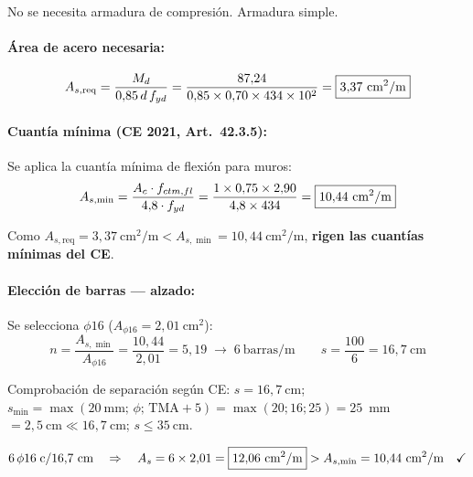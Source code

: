No se necesita armadura de compresión. Armadura simple.

\paragraph{Área de acero necesaria:}
\begin{equation}
  A_{s,\mathrm{req}} = \frac{M_d}{0{,}85\,d\,f_{yd}}
    = \frac{87{,}24}{0{,}85 \times 0{,}70 \times 434 \times 10^2}
    = \boxed{3{,}37~\text{cm}^2/\text{m}}
  \label{eq:As_fuste_calc}
\end{equation}

\paragraph{Cuantía mínima (CE 2021, Art.\ 42.3.5):}

Se aplica la cuantía mínima de flexión para muros:
\begin{equation}
  A_{s,\min} = \frac{A_c \cdot f_{ctm,fl}}{4{,}8 \cdot f_{yd}}
    = \frac{1 \times 0{,}75 \times 2{,}90}{4{,}8 \times 434}
    = \boxed{10{,}44~\text{cm}^2/\text{m}}
  \label{eq:As_min_fuste}
\end{equation}

Como $A_{s,\mathrm{req}} = 3{,}37~\text{cm}^2/\text{m} < A_{s,\min} = 10{,}44~\text{cm}^2/\text{m}$,
\textbf{rigen las cuantías mínimas del CE}.

\paragraph{Elección de barras — alzado:}

Se selecciona $\phi 16$ ($A_{\phi 16} = 2{,}01~\text{cm}^2$):
\[
  n = \frac{A_{s,\min}}{A_{\phi 16}} = \frac{10{,}44}{2{,}01} = 5{,}19
  \;\longrightarrow\; 6~\text{barras/m}
  \qquad
  s = \frac{100}{6} = 16{,}7~\text{cm}
\]

Comprobación de separación según CE: $s = 16{,}7~\text{cm}$;
$s_{\min} = \max(20~\text{mm};\,\phi;\,\mathrm{TMA}+5) = \max(20;16;25) = 25$~mm
$= 2{,}5~\text{cm} \ll 16{,}7~\text{cm}$\checkmark;
$s \leq 35~\text{cm}$\checkmark.

\begin{resultadobox}
  \[
    6\,\phi 16 \;\text{c}/16{,}7~\text{cm}
    \quad\Rightarrow\quad
    A_s = 6 \times 2{,}01 = \boxed{12{,}06~\text{cm}^2/\text{m}}
    > A_{s,\min} = 10{,}44~\text{cm}^2/\text{m} \quad\checkmark
  \]
\end{resultadobox}

